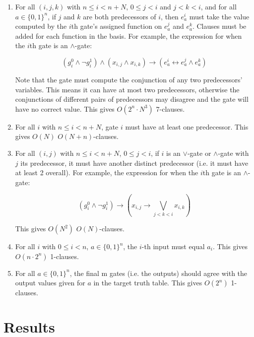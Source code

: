 \documentclass{article}
\begin{document}
\begin{enumerate}
  \item For all \((i,j,k)\) with \(n \leq i < n+N\), \(0 \leq j < i\) and \(j < k < i\), and for all \(a\in\{0,1\}^n\), if \(j\) and \(k\) are both predecessors of \(i\), then \(e^i_a\) must take the value computed by the \(i\)th gate's assigned function on \(e^j_a\) and \(e^k_a\). Clauses must be added for each function in the basis. For example, the expression for when the \(i\)th gate is an \(\land\)-gate:

\[
(g^0_i\wedge \neg g^1_i)\wedge 
(x_{i,j}\wedge x_{i,k})\rightarrow 
(e^i_a\leftrightarrow e^j_a\wedge e^k_a)
\]
  
  Note that the gate must compute the conjunction of any two predecessors' variables. This means it can have at most two predecessors, otherwise the conjunctions of different pairs of predecessors may disagree and the gate will have no correct value. This gives \(O(2^n\cdot N^3)\) 7-clauses.

  \item For all \(i\) with \(n \leq i < n+N\), gate \(i\) must have at least one predecessor. This gives \(O(N)\) \(O(N+n)\)-clauses.

  \item For all \((i,j)\) with \(n \leq i < n+N\), \(0 \leq j < i\), if \(i\) is an \(\lor\)-gate or \(\land\)-gate with \(j\) its predecessor, it must have another distinct predecessor (i.e. it must have at least 2 overall). For example, the expression for when the \(i\)th gate is an \(\land\)-gate:

\[
(g^0_i \land \neg g^1_i) \rightarrow \left( x_{i,j} \rightarrow \bigvee_{j<k<i} x_{i,k} \right)
\]

  This gives \(O(N^2)\) \(O(N)\)-clauses.

  \item For all \(i\) with \(0 \leq i < n\), \(a\in\{0,1\}^n\), the \(i\)-th input must equal \(a_i\). This gives \(O(n \cdot 2^n)\) 1-clauses.

  \item For all \(a\in\{0,1\}^n\), the final m gates (i.e. the outputs) should agree with the output values given for \(a\) in the target truth table. This gives \(O(2^n)\) 1-clauses.

\end{enumerate}

\section{Results}
\end{document}
